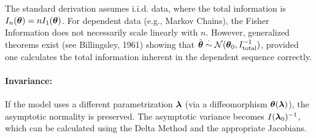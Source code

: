 \begin{note}
    
The standard derivation assumes i.i.d. data, where the total information is $I_n(\boldsymbol{\theta}) = n I_1(\boldsymbol{\theta})$.
For dependent data (e.g., Markov Chains), the Fisher Information does not necessarily scale linearly with $n$. However, generalized theorems exist (see Billingsley, 1961) showing that $\hat{\boldsymbol{\theta}} \stackrel{\cdot}{\sim} \mathcal{N}(\boldsymbol{\theta}_0, I_{\text{total}}^{-1})$, provided one calculates the total information inherent in the dependent sequence correctly.
\end{note}

\paragraph{Invariance:}
If the model uses a different parametrization $\boldsymbol{\lambda}$ (via a diffeomorphism $\boldsymbol{\theta}(\boldsymbol{\lambda})$), the asymptotic normality is preserved. The asymptotic variance becomes $I(\boldsymbol{\lambda}_0)^{-1}$, which can be calculated using the Delta Method and the appropriate Jacobians.
